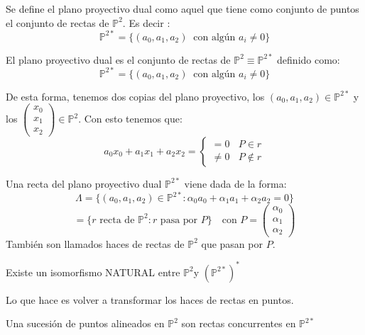 \begin{ndef}
	Se define el plano proyectivo dual como aquel que tiene como conjunto de puntos el conjunto de rectas de $\mathbb{P}^2$. Es decir :
	$$\mathbb{P}^{2*} = \{ (a_0,a_1,a_2) \ \text{ con algún $a_i\ne 0$}\}$$
\end{ndef}

\begin{ndef}
	El plano proyectivo dual es el conjunto de rectas de $\mathbb P ^2 \equiv \mathbb P^{2*}$ definido como:
	\[
	\mathbb P^{2*} = \{ (a_0,a_1,a_2) \ \text{ con algún $a_i\ne 0$}\}
	\]
\end{ndef}
De esta forma, tenemos dos copias del plano proyectivo, los $(a_0,a_1,a_2)\in \mathbb P^{2*}$ y los $\begin{pmatrix}
 x_0\\
 x_1\\
 x_2
\end{pmatrix}  \in \mathbb P ^2$. Con esto tenemos que:
\[
a_0 x_0 + a_1x_1 + a_2x_2 = \begin{cases}
	=0 \ \ \ \ P \in r\\
	\ne 0 \ \ \ \ P \notin r
\end{cases}
\]

\begin{ndef}
	Una recta del plano proyectivo dual $\mathbb P^{2*}$ viene dada de la forma:
	\[
	\Lambda = \{ (a_0, a_1,a_2) \in \mathbb P^{2*} : \alpha_0a_0 + \alpha_1 a_1 + \alpha_2 a_2 = 0\}
	\]
	\[
	= \{ r \text{ recta de } \mathbb P ^2  : r \text { pasa por } P\} \ \ \ \text{ con } P = \begin{pmatrix}
 \alpha_0\\
 \alpha_1\\
 \alpha_2
\end{pmatrix}
	\]
	También son llamados haces de rectas de $\mathbb P^2$ que pasan por $P$.
\end{ndef}

\begin{nth}
	Existe un isomorfismo NATURAL entre $\mathbb P^2 $y $(\mathbb P^{2*})^*$
\end{nth}
\begin{nota}
	Lo que hace es volver a transformar los haces de rectas en puntos.
\end{nota}

\begin{nprop}[Propiedades]
	\begin{nlist}
	\item Una sucesión de puntos alineados en $\mathbb P^2$ son rectas concurrentes en $\mathbb P^{2*}$
\end{nlist}
\end{nprop}

